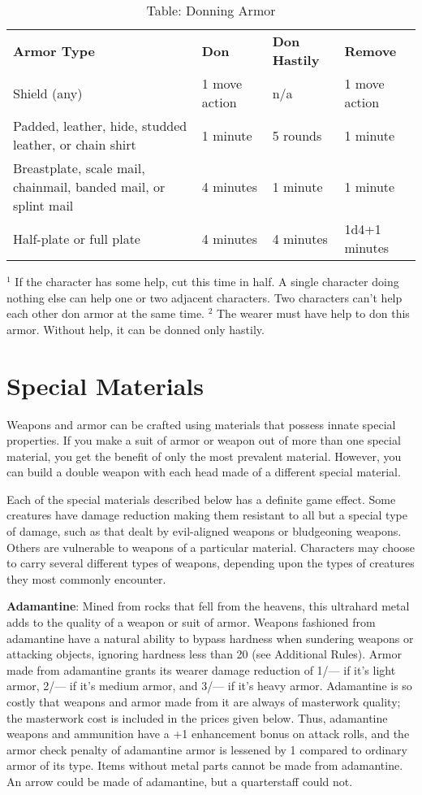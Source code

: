 \begin{table}[]
\caption{Table: Donning Armor}
\begin{tabular}{llll}
\textbf{Armor Type} & \textbf{Don} & \textbf{Don Hastily} & \textbf{Remove}\\
Shield (any) & 1 move action &  n/a & 1 move action \\
Padded, leather, hide, studded leather, or chain shirt & 1 minute & 5 rounds & 1 minute \\
Breastplate, scale mail, chainmail, banded mail, or splint mail & 4 minutes & 1 minute & 1 minute \\
Half-plate or full plate & 4 minutes & 4 minutes & 1d4+1 minutes\\
\end{tabular}
\(^{1}\) If the character has some help, cut this time in half. A single character doing nothing else can help one or two adjacent characters. Two characters can't help each other don armor at the same time.
\(^{2}\) The wearer must have help to don this armor. Without help, it can be donned only hastily.
\end{table}

\section{Special Materials}
	
Weapons and armor can be crafted using materials that possess innate special properties. If you make a suit of armor or weapon out of more than one special material, you get the benefit of only the most prevalent material. However, you can build a double weapon with each head made of a different special material. 
	
Each of the special materials described below has a definite game effect. Some creatures have damage reduction making them resistant to all but a special type of damage, such as that dealt by evil-aligned weapons or bludgeoning weapons. Others are vulnerable to weapons of a particular material. Characters may choose to carry several different types of weapons, depending upon the types of creatures they most commonly encounter. 
	
\textbf{Adamantine}: Mined from rocks that fell from the heavens, this ultrahard metal adds to the quality of a weapon or suit of armor. Weapons fashioned from adamantine have a natural ability to bypass hardness when sundering weapons or attacking objects, ignoring hardness less than 20 (see Additional Rules). Armor made from adamantine grants its wearer damage reduction of 1/--- if it's light armor, 2/--- if it's medium armor, and 3/--- if it's heavy armor. Adamantine is so costly that weapons and armor made from it are always of masterwork quality; the masterwork cost is included in the prices given below. Thus, adamantine weapons and ammunition have a +1 enhancement bonus on attack rolls, and the armor check penalty of adamantine armor is lessened by 1 compared to ordinary armor of its type. Items without metal parts cannot be made from adamantine. An arrow could be made of adamantine, but a quarterstaff could not.
	
